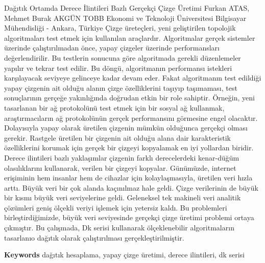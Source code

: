 
    \begin{abstract_online}{Dağıtık Ortamda Derece İlintileri Bazlı Gerçekçi Çizge Üretimi}{%
        Furkan ATAS, Mehmet Burak AKGÜN}{%
        }{%
        TOBB Ekonomi ve Teknoloji Üniversitesi Bilgisayar Mühendisliği - Ankara, Türkiye}
    Çizge üreteçleri, yeni geliştirilen topolojik algoritmaları test etmek için kullanılan araçlardır. Algoritmalar gerçek sistemler üzerinde çalıştırılmadan önce, yapay çizgeler üzerinde performansları değerlendirilir. Bu testlerin sonucuna göre algoritmada gerekli düzenlemeler yapılır ve tekrar test edilir. Bu döngü, algoritmanın performansı istekleri karşılayacak seviyeye gelinceye kadar devam eder. Fakat algoritmanın test edildiği yapay çizgenin ait olduğu alanın çizge özelliklerini taşıyıp taşımaması, test sonuçlarının gerçeğe yakınlığında doğrudan etkin bir role sahiptir. Örneğin, yeni tasarlanan bir ağ protokolünü test etmek için bir sosyal ağ kullanmak, araştırmacıların ağ protokolünün gerçek performansını görmesine engel olacaktır. Dolayısıyla yapay olarak üretilen çizgenin mümkün olduğunca gerçekçi olması gerekir. Rastgele üretilen bir çizgenin ait olduğu alana dair karakteristik özelliklerini korumak için gerçek bir çizgeyi kopyalamak en iyi yollardan biridir. Derece ilintileri bazlı yaklaşımlar çizgenin farklı derecelerdeki kenar-düğüm olasılıklarını kullanarak, verilen bir çizgeyi kopyalar. Günümüzde, internet erişiminin hem insanlar hem de cihazlar için kolaylaşmasıyla, üretilen veri hızla arttı. Büyük veri bir çok alanda kaçınılmaz hale geldi. Çizge verilerinin de büyük bir kısmı büyük veri seviyelerine geldi. Geleneksel tek makineli veri analitik çözümleri geniş ölçekli veriyi işlemek için yetersiz kaldı. Bu problemleri birleştirdiğimizde, büyük veri seviyesinde gerçekçi çizge üretimi problemi ortaya çıkmıştır. Bu çalışmada, Dk serisi kullanarak ölçeklenebilir algoritmaların tasarlanıo dağıtık olarak çalıştırılması gerçekleştirilmiştir. 
    
        \textbf{Keywords} \newline{}dağıtık hesaplama, yapay çizge üretimi, derece ilintileri, dk serisi
    \end{abstract_online}
    